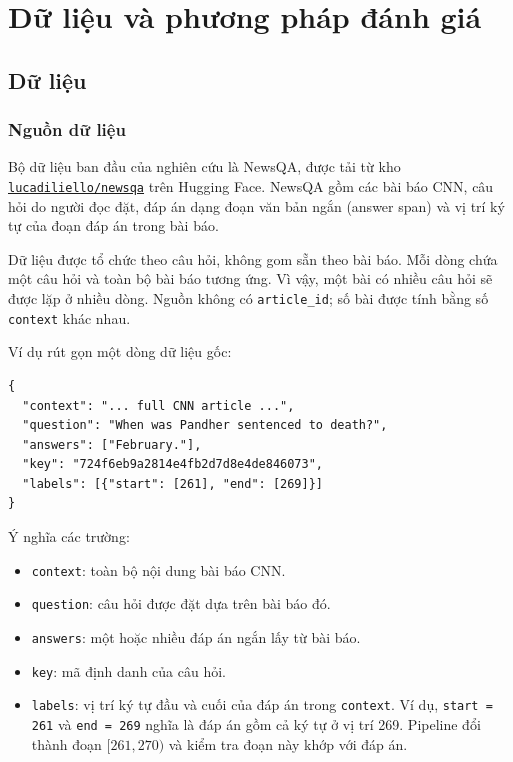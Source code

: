 \section{Dữ liệu và phương pháp đánh giá}

\subsection{Dữ liệu}

\subsubsection{Nguồn dữ liệu}

Bộ dữ liệu ban đầu của nghiên cứu là NewsQA, được tải từ kho
\href{https://huggingface.co/datasets/lucadiliello/newsqa}
{\texttt{lucadiliello/newsqa}} trên Hugging Face. NewsQA gồm các bài báo CNN,
câu hỏi do người đọc đặt, đáp án dạng đoạn văn bản ngắn (answer span) và vị trí
ký tự của đoạn đáp án trong bài báo.

Dữ liệu được tổ chức theo câu hỏi, không gom sẵn theo bài báo. Mỗi dòng chứa
một câu hỏi và toàn bộ bài báo tương ứng. Vì vậy, một bài có nhiều câu hỏi sẽ
được lặp ở nhiều dòng. Nguồn không có \texttt{article\_id}; số bài được tính
bằng số \texttt{context} khác nhau.

Ví dụ rút gọn một dòng dữ liệu gốc:

\begin{verbatim}
{
  "context": "... full CNN article ...",
  "question": "When was Pandher sentenced to death?",
  "answers": ["February."],
  "key": "724f6eb9a2814e4fb2d7d8e4de846073",
  "labels": [{"start": [261], "end": [269]}]
}
\end{verbatim}

Ý nghĩa các trường:

\begin{itemize}
  \item \texttt{context}: toàn bộ nội dung bài báo CNN.
  \item \texttt{question}: câu hỏi được đặt dựa trên bài báo đó.
  \item \texttt{answers}: một hoặc nhiều đáp án ngắn lấy từ bài báo.
  \item \texttt{key}: mã định danh của câu hỏi.
  \item \texttt{labels}: vị trí ký tự đầu và cuối của đáp án trong
  \texttt{context}. Ví dụ, \texttt{start = 261} và \texttt{end = 269} nghĩa
  là đáp án gồm cả ký tự ở vị trí 269. Pipeline đổi thành đoạn
  $[261,270)$ và kiểm tra đoạn này khớp với đáp án.
\end{itemize}

